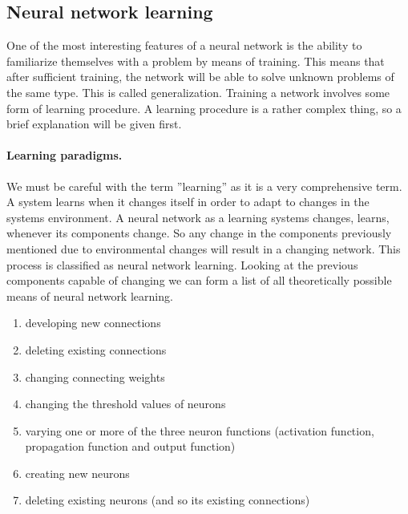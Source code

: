 \documentclass[pdftex,a4paper,12pt,twoside]{report}
\theoremstyle{plain} \newtheorem{theorem}{Theorem} \newtheorem{proposition}{Proposition} \newtheorem{lemma}{Lemma} \newtheorem*{corollary}{Corollary}
\theoremstyle{definition} \newtheorem{definition}{Definition} \newtheorem{conjecture}{Conjecture} \newtheorem*{example}{Example} \newtheorem{algorithm}{Algorithm}
\theoremstyle{remark} \newtheorem*{remark}{Remark} \newtheorem*{note}{Note} \newtheorem{case}{Case}
\begin{document}
\subsection{Neural network learning}
One of the most interesting features of a neural network is the ability to familiarize themselves with a problem by means of training. This means that after sufficient training, the network will be able to solve unknown problems of the same type. This is called generalization. Training a  network involves some form of learning procedure. A learning procedure is a rather complex thing, so a brief explanation will be given first.
\paragraph{Learning paradigms.}
We must be careful with the term ''learning'' as it is a very comprehensive term. A system learns when it changes itself in order to adapt to changes in the systems environment. A neural network as a learning systems changes, learns, whenever its components change. So any change in the components previously  mentioned due to environmental changes will result in a changing network. This process is classified as neural network learning. Looking at the previous components capable of changing we can form a list of all theoretically possible means of neural network learning.
\begin{enumerate}
\item developing new connections
\item deleting existing connections
\item changing connecting weights
\item changing the threshold values of neurons
\item varying one or more of the three neuron functions (activation function, propagation function and output function)
\item creating new neurons
\item deleting existing neurons (and so its existing connections)
\end{enumerate}
\end{document}

